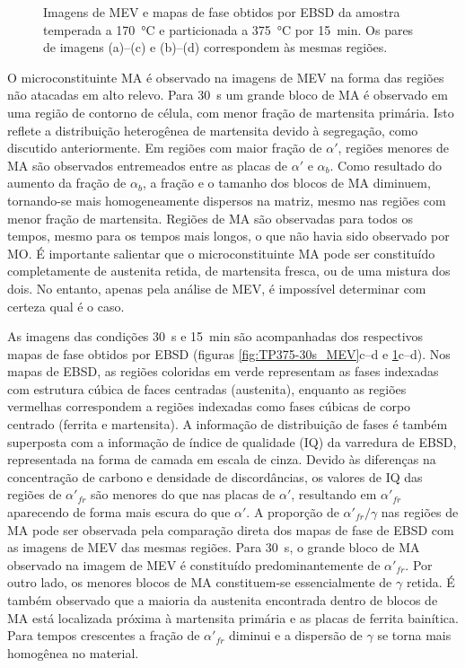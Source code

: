 \begin{figure}
  \caption{Imagens de MEV e mapas de fase obtidos por EBSD da amostra temperada a \SI{170}{\degreeCelsius} e particionada a \SI{375}{\degreeCelsius} por 15~min. Os pares de imagens (a)--(c) e (b)--(d) correspondem às mesmas regiões.}
  \label{fig:TP375-15min_MEV}
\end{figure}

O microconstituinte MA é observado na imagens de MEV na forma das regiões não atacadas em alto relevo.
Para 30~s um grande bloco de MA é observado em uma região de contorno de célula, com menor fração de martensita primária. Isto reflete a distribuição heterogênea de martensita devido à segregação, como discutido anteriormente. Em regiões com maior fração de $\alpha'$, regiões menores de MA são observados entremeados entre as placas de $\alpha'$ e $\alpha_b$. Como resultado do aumento da fração de $\alpha_b$, a fração e o tamanho dos blocos de MA diminuem, tornando-se mais homogeneamente dispersos na matriz, mesmo nas regiões com menor fração de martensita.
Regiões de MA são observadas para todos os tempos, mesmo para os tempos mais longos, o que não havia sido observado por MO. É importante salientar que o microconstituinte MA pode ser constituído completamente de austenita retida, de martensita fresca, ou de uma mistura dos dois. No entanto, apenas pela análise de MEV, é impossível determinar com certeza qual é o caso.

As imagens das condições 30~s e 15~min são acompanhadas dos respectivos mapas de fase obtidos por EBSD (figuras \ref{fig:TP375-30s_MEV}c--d e \ref{fig:TP375-15min_MEV}c--d). Nos mapas de EBSD, as regiões coloridas em verde representam as fases indexadas com estrutura cúbica de faces centradas (austenita), enquanto as regiões vermelhas correspondem a regiões indexadas como fases cúbicas de corpo centrado (ferrita e martensita). A informação de distribuição de fases é também superposta com a informação de índice de qualidade (IQ) da varredura de EBSD, representada na forma de camada em escala de cinza. Devido às diferenças na concentração de carbono e densidade de discordâncias, os valores de IQ das regiões de $\alpha'_{fr}$ são menores do que nas placas de $\alpha'$, resultando em $\alpha'_{fr}$ aparecendo de forma mais escura do que $\alpha'$. A proporção de $\alpha'_{fr}/\gamma$ nas regiões de MA pode ser observada pela comparação direta dos mapas de fase de EBSD com as imagens de MEV das mesmas regiões. Para 30~s, o grande bloco de MA observado na imagem de MEV é constituído predominantemente de $\alpha'_{fr}$. Por outro lado, os menores blocos de MA constituem-se essencialmente de $\gamma$ retida. É também observado que a maioria da austenita encontrada dentro de blocos de MA está localizada próxima à martensita primária e as placas de ferrita bainítica. Para tempos crescentes a fração de $\alpha'_{fr}$ diminui e a dispersão de $\gamma$ se torna mais homogênea no material.


